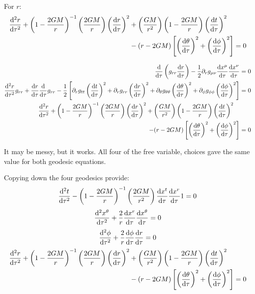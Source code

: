\documentclass[11pt]{article}
\begin{document}
\begin{enumerate}[label=\alph*)]
For $r$:
\begin{align*}
\dv[2]{r}{\tau} + \left(1 - \frac{2GM}{r}\right)^{-1}\left(\frac{2GM}{r}\right)\left(\dv{r}{\tau}\right)^2 & + \left(\frac{GM}{r^2}\right)\left(1-\frac{2GM}{r}\right)\left(\dv{t}{\tau}\right)^2 \\
& - (r - 2GM)\left[\left(\dv{\theta}{\tau}\right)^2 + \left(\dv{\phi}{\tau}\right)^2\right] = 0
\end{align*}

\begin{align*}
\dv{\tau}\left(g_{rr}\dv{r}{\tau}\right)-\frac{1}{2}\partial_r g_{\mu\nu}\dv{x^\mu}{\tau}\dv{x^\nu}{\tau} & = 0\\
\dv[2]{r}{\tau}g_{rr} + \dv{r}{\tau}\dv{\tau}g_{rr} - \frac{1}{2}\left[\partial_r g_{tt}\left(\dv{t}{\tau}\right)^2 + \partial_r g_{rr}\left(\dv{r}{\tau}\right)^2 + \partial_\theta g_{\theta\theta}\left(\dv{\theta}{\tau}\right)^2 + \partial_\phi g_{\phi\phi}\left(\dv{\phi}{\tau}\right)^2\right] & = 0\\
\dv[2]{r}{\tau} + \left(1 - \frac{2GM}{r}\right)^{-1}\left(\frac{2GM}{r}\right)\left(\dv{r}{\tau}\right)^2 + \left(\frac{GM}{r^2}\right)\left(1-\frac{2GM}{r}\right)\left(\dv{t}{\tau}\right)^2 \quad & \, \\
- (r - 2GM)\left[\left(\dv{\theta}{\tau}\right)^2 + \left(\dv{\phi}{\tau}\right)^2\right] & = 0
\end{align*}

It may be messy, but it works. All four of the free variable, choices gave the same value for both geodesic equations.

Copying down the four geodesics provide:
\[\dv[2]{t}{\tau} - \left(1 - \frac{2GM}{r}\right)^{-1}\left(\frac{2GM}{r^2}\right)\dv{x^t}{\tau}\dv{x^r}{\tau} 1= 0\]
\[\dv[2]{x^\theta}{\tau} + \frac{2}{r}\dv{x^r}{\tau}\dv{x^\theta}{\tau} =  0\]
\[\dv[2]{\phi}{\tau} + \frac{2}{r}\dv{\phi}{\tau}\dv{r}{\tau} = 0\]
\begin{align*}
\dv[2]{r}{\tau} + \left(1 - \frac{2GM}{r}\right)^{-1}\left(\frac{2GM}{r}\right)\left(\dv{r}{\tau}\right)^2 & + \left(\frac{GM}{r^2}\right)\left(1-\frac{2GM}{r}\right)\left(\dv{t}{\tau}\right)^2 \\
& - (r - 2GM)\left[\left(\dv{\theta}{\tau}\right)^2 + \left(\dv{\phi}{\tau}\right)^2\right] = 0
\end{align*}

\end{enumerate}
\end{document}
